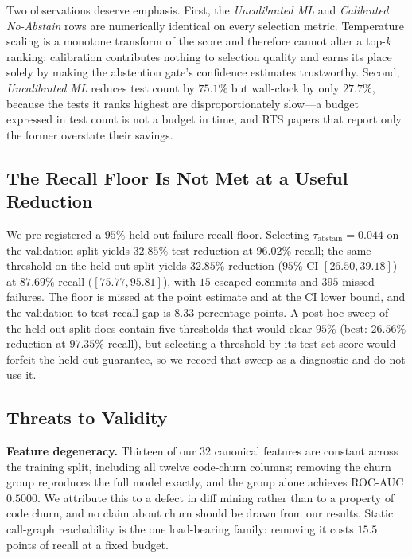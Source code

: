 \documentclass[sigconf,screen]{acmart}
\begin{document}
Two observations deserve emphasis. First, the \emph{Uncalibrated ML} and \emph{Calibrated No-Abstain} rows are numerically identical on every selection metric. Temperature scaling is a monotone transform of the score and therefore cannot alter a top-$k$ ranking: calibration contributes nothing to selection quality and earns its place solely by making the abstention gate's confidence estimates trustworthy. Second, \emph{Uncalibrated ML} reduces test count by $75.1\%$ but wall-clock by only $27.7\%$, because the tests it ranks highest are disproportionately slow---a budget expressed in test count is not a budget in time, and RTS papers that report only the former overstate their savings.

\subsection{The Recall Floor Is Not Met at a Useful Reduction}

We pre-registered a $95\%$ held-out failure-recall floor. Selecting $\tau_{\text{abstain}}=0.044$ on the validation split yields $32.85\%$ test reduction at $96.02\%$ recall; the same threshold on the held-out split yields $32.85\%$ reduction ($95\%$ CI $[26.50, 39.18]$) at $87.69\%$ recall ($[75.77, 95.81]$), with $15$ escaped commits and $395$ missed failures. The floor is missed at the point estimate and at the CI lower bound, and the validation-to-test recall gap is $8.33$ percentage points. A post-hoc sweep of the held-out split does contain five thresholds that would clear $95\%$ (best: $26.56\%$ reduction at $97.35\%$ recall), but selecting a threshold by its test-set score would forfeit the held-out guarantee, so we record that sweep as a diagnostic and do not use it.

\subsection{Threats to Validity}

\textbf{Feature degeneracy.} Thirteen of our $32$ canonical features are constant across the training split, including all twelve code-churn columns; removing the churn group reproduces the full model exactly, and the group alone achieves ROC-AUC $0.5000$. We attribute this to a defect in diff mining rather than to a property of code churn, and no claim about churn should be drawn from our results. Static call-graph reachability is the one load-bearing family: removing it costs $15.5$ points of recall at a fixed budget.
\end{document}

